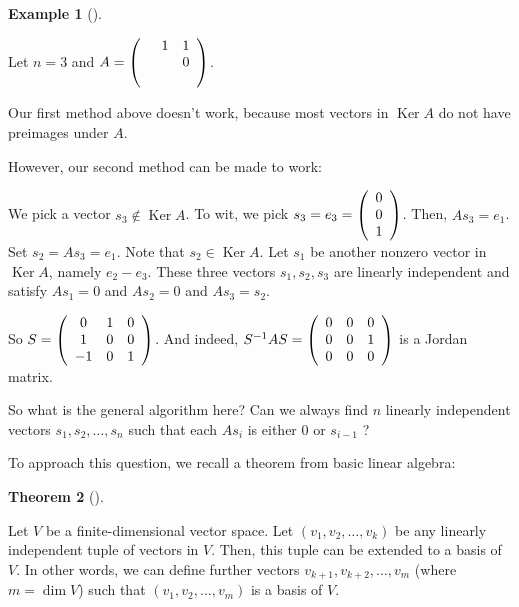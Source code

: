 \documentclass[numbers=enddot,12pt,final,onecolumn,notitlepage]{scrartcl}%
\numberwithin{exer}{subsection}
\theoremstyle{definition}
\newtheorem{theo}{Theorem}[subsection]
\newenvironment{theorem}[1][]
{\begin{theo}[#1]\begin{leftbar}}
{\end{leftbar}\end{theo}}
\newtheorem{exam}[theo]{Example}
\newenvironment{example}[1][]
{\begin{exam}[#1]\begin{leftbar}}
{\end{leftbar}\end{exam}}
\begin{document}
\begin{example}
Let $n=3$ and $A=\left(
\begin{array}
[c]{ccc}
& 1 & 1\\
&  & 0\\
&  &
\end{array}
\right)  $.

Our first method above doesn't work, because most vectors in
$\operatorname*{Ker}A$ do not have preimages under $A$.

However, our second method can be made to work:

We pick a vector $s_{3}\notin\operatorname*{Ker}A$. To wit, we pick
$s_{3}=e_{3}=\left(
\begin{array}
[c]{c}%
0\\
0\\
1
\end{array}
\right)  $. Then, $As_{3}=e_{1}$. Set $s_{2}=As_{3}=e_{1}$. Note that
$s_{2}\in\operatorname*{Ker}A$. Let $s_{1}$ be another nonzero vector in
$\operatorname*{Ker}A$, namely $e_{2}-e_{3}$.{} These three vectors
$s_{1},s_{2},s_{3}$ are linearly independent and satisfy $As_{1}=0$ and
$As_{2}=0$ and $As_{3}=s_{2}$.

So $S=\left(
\begin{array}
[c]{ccc}%
0 & 1 & 0\\
1 & 0 & 0\\
-1 & 0 & 1
\end{array}
\right)  $. And indeed, $S^{-1}AS=\allowbreak\left(
\begin{array}
[c]{ccc}%
0 & 0 & 0\\
0 & 0 & 1\\
0 & 0 & 0
\end{array}
\right)  $ is a Jordan matrix.
\end{example}

So what is the general algorithm here? Can we always find $n$ linearly
independent vectors $s_{1},s_{2},\ldots,s_{n}$ such that each $As_{i}$ is
either $0$ or $s_{i-1}$ ?

\bigskip

To approach this question, we recall a theorem from basic linear algebra:

\begin{theorem}
Let $V$ be a finite-dimensional vector space. Let $\left(  v_{1},v_{2}%
,\ldots,v_{k}\right)  $ be any linearly independent tuple of vectors in $V$.
Then, this tuple can be extended to a basis of $V$. In other words, we can
define further vectors $v_{k+1},v_{k+2},\ldots,v_{m}$ (where $m=\dim V$) such
that $\left(  v_{1},v_{2},\ldots,v_{m}\right)  $ is a basis of $V$.
\end{theorem}
\end{document}
